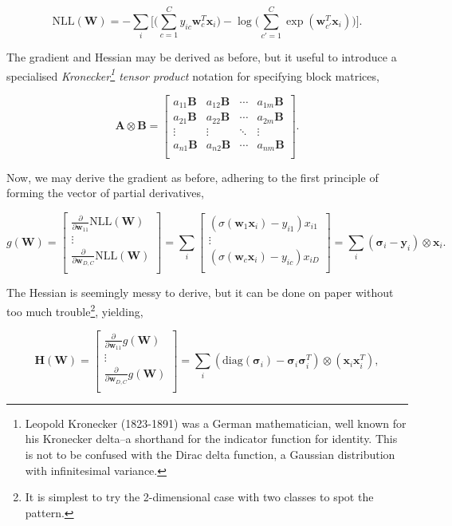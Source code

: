 \documentclass[11pt]{amsart}
\begin{document}
$$\text{NLL}(\mathbf{W}) = -\sum_i \bigg[\bigg(\sum_{c = 1}^Cy_{ic}\mathbf{w}_c^T\mathbf{x}_i\bigg) - \log\bigg(\sum_{c'=1}^C\exp(\mathbf{w}_{c'}^T\mathbf{x}_i)\bigg)\bigg].$$

The gradient and Hessian may be derived as before, but it useful to introduce a specialised \emph{Kronecker\footnote{Leopold Kronecker (1823-1891) was a German mathematician, well known for his Kronecker delta--a shorthand for the indicator function for identity. This is not to be confused with the Dirac delta function, a Gaussian distribution with infinitesimal variance.} tensor product} notation for specifying block matrices,

$$\mathbf{A} \otimes \mathbf{B} = \begin{bmatrix}
a_{11}\mathbf{B}&a_{12}\mathbf{B}&\cdots&a_{1m}\mathbf{B}\\
a_{21}\mathbf{B}&a_{22}\mathbf{B}&\cdots&a_{2m}\mathbf{B}\\
\vdots & \vdots & \ddots & \vdots \\
a_{n1}\mathbf{B}&a_{n2}\mathbf{B}&\cdots&a_{nm}\mathbf{B}\\
\end{bmatrix}.$$

Now, we may derive the gradient as before, adhering to the first principle of forming the vector of partial derivatives,

$$g(\mathbf{W}) = \begin{bmatrix}
\frac{\partial}{\partial \mathbf{w}_{11}} \text{NLL}(\mathbf{W}) \\
\vdots \\
\frac{\partial}{\partial \mathbf{w}_{D, C}} \text{NLL}(\mathbf{W}) \\
\end{bmatrix} =
\sum_i \begin{bmatrix}
(\sigma(\mathbf{w}_1\mathbf{x}_i) - y_{i1})x_{i1} \\
\vdots \\
(\sigma(\mathbf{w}_c\mathbf{x}_i) - y_{ic})x_{iD} \\
\end{bmatrix}
= \sum_i (\boldsymbol\sigma_i - \mathbf{y}_i)\otimes\mathbf{x}_i.
$$

The Hessian is seemingly messy to derive, but it can be done on paper without too much trouble\footnote{It is simplest to try the 2-dimensional case with two classes to spot the pattern.}, yielding,

$$\mathbf{H}(\mathbf{W}) =  \begin{bmatrix}
\frac{\partial}{\partial \mathbf{w}_{11}} g(\mathbf{W}) \\
\vdots \\
\frac{\partial}{\partial \mathbf{w}_{D, C}} g(\mathbf{W}) \\
\end{bmatrix} = \sum_i (\text{diag}(\boldsymbol\sigma_i) - \boldsymbol\sigma_i\boldsymbol\sigma_i^T)\otimes(\mathbf{x}_i\mathbf{x}_i^T),$$
\end{document}
